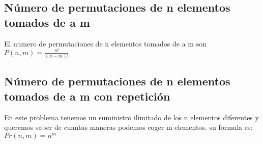 \subsection{Número de permutaciones de n elementos tomados de a m}
El numero de permutaciones de n elementos tomados de a m son
$P(n,m)=\frac{n!}{\left (n-m  \right )!}$
\subsection{Número de permutaciones de n elementos tomados de a m con repetición}
En este problema tenemos un suministro ilimitado de los n elementos diferentes y queremos saber de cuantas maneras podemos coger m elementos. su formula es:
$Pr(n,m)=n^{m}$
